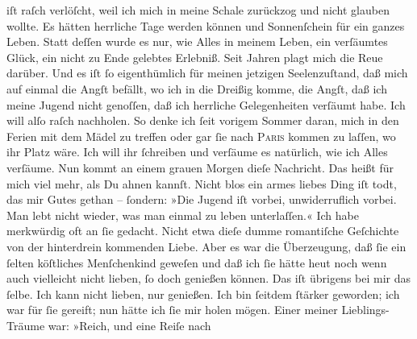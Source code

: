 \begin{ledgroupsized}[t]{13cm}
               iſt {\pb}raſch verlöſcht, weil ich mich in meine Schale
               zurückzog und nicht glauben wollte. Es hätten herrliche Tage werden können und
               Sonnenſchein für ein ganzes Leben. Statt deſſen wurde es nur, wie Alles in meinem
               Leben, ein verſäumtes Glück, ein nicht zu Ende gelebtes Erlebniß. Seit Jahren plagt
               mich die Reue darüber. Und es iſt ſo eigenthümlich für meinen jetzigen Seelenzuſtand,
               daß mich auf einmal die Angſt befällt, wo ich in die Dreißig komme, die Angſt, daß
               ich \strikeout{\textcolor{gray}{d}} meine Jugend nicht genoſſen, daß ich herrliche Gelegenheiten verſäumt habe.
               Ich will alſo raſch nachholen. So denke ich ſeit vorigem Sommer daran, mich in den
               Ferien {\pb}mit dem Mädel zu treffen oder gar ſie nach \textsc{Paris} kommen zu laſſen, wo ihr Platz wäre. Ich will ihr ſchreiben und verſäume es
               natürlich, wie ich Alles verſäume. Nun kommt an einem grauen Morgen dieſe Nachricht.
               Das heißt für mich viel mehr, als Du ahnen kannſt. Nicht blos ein armes liebes Ding iſt todt, das mir Gutes
               gethan – ſondern: »Die Jugend iſt vorbei, unwiderruflich vorbei. Man lebt nicht
               wieder, was man einmal zu leben unterlaſſen.«\pend
           \pstart
           Ich habe merkwürdig oft an ſie gedacht. Nicht etwa dieſe dumme romantiſche Geſchichte
               von der hinterdrein kommenden Liebe. Aber  es war
               die Überzeugung, daß ſie ein
               ſelten köſtliches Menſchenkind geweſen {\pb}und daß ich ſie hätte
                  heut noch wenn auch vielleicht nicht lieben, ſo
               doch genießen können. Das iſt übrigens bei mir das ſelbe. Ich kann nicht lieben, nur
               genießen. Ich bin ſeitdem ſtärker geworden; ich war für ſie gereift; nun hätte ich
               ſie mir holen mögen. Einer meiner Lieblings-Träume war: »Reich, und eine Reiſe nach

\end{ledgroupsized}
